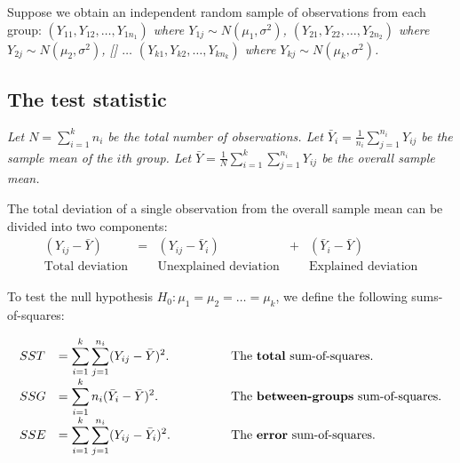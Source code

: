 \medskip
Suppose we obtain an independent random sample of observations from each group:
\bit
\it $(Y_{11}, Y_{12}, \ldots, Y_{1n_1})$ where $Y_{1j}\sim N(\mu_1,\sigma^2)$,
\it $(Y_{21}, Y_{22}, \ldots, Y_{2n_2})$ where $Y_{2j}\sim N(\mu_2,\sigma^2)$,
\it[] $\ldots$
\it $(Y_{k1}, Y_{k2}, \ldots, Y_{kn_k})$ where $Y_{kj}\sim N(\mu_k,\sigma^2)$.
\eit


\subsection{The test statistic}

\bit
\it Let $N=\sum_{i=1}^k n_i$ be the total number of observations. 
\it Let $\bar{Y}_i = \frac{1}{n_i}\sum_{j=1}^{n_i} Y_{ij}$ be the sample mean of the $i$th group.%
\it Let $\bar{Y} = \frac{1}{N}\sum_{i=1}^k\sum_{j=1}^{n_i} Y_{ij}$ be the overall sample mean.
\eit

The total deviation of a single observation from the overall sample mean can be divided into two components:
\[
\begin{array}{ccccc}
(Y_{ij}-\bar{Y})		& = & (Y_{ij}-\bar{Y}_i)			& + & (\bar{Y}_i-\bar{Y})  \\[1ex]
\text{Total deviation} 	& 	& \text{Unexplained deviation}	& 	& \text{Explained deviation} 	
\end{array}
\]

To test the null hypothesis $H_0:\mu_1=\mu_2=\ldots=\mu_k$, we define the following sums-of-squares:

%
%
%
%
\[
\begin{array}{lll}
SST	& = \displaystyle\sum_{i=1}^k\sum_{j=1}^{n_i} (Y_{ij}-\bar{Y})^2.
\qquad\qquad & \text{The \textbf{total} sum-of-squares.} \\
SSG	& = \displaystyle\sum_{i=1}^k n_i (\bar{Y}_i-\bar{Y})^2.
\qquad & \text{The \textbf{between-groups} sum-of-squares.} \\
SSE	& = \displaystyle\sum_{i=1}^k\sum_{j=1}^{n_i} (Y_{ij}-\bar{Y}_i)^2.
\qquad & \text{The \textbf{error} sum-of-squares.} \\
\end{array}
\]

